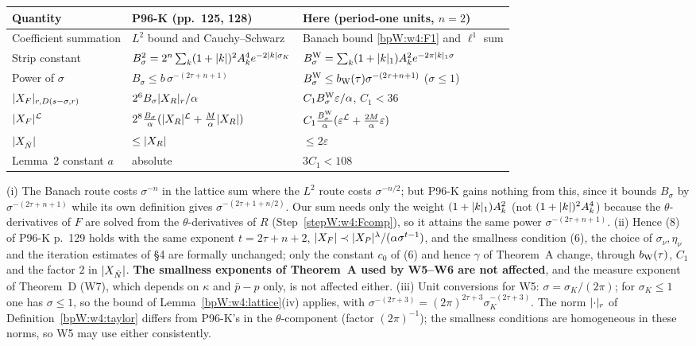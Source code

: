 \begin{remark}\label{bpW:w4:compare}
\begin{center}\small
\begin{tabular}{@{}lll@{}}
\toprule
Quantity & P96-K (pp.~125, 128) & Here (period-one units, $n=2$)\\
\midrule
Coefficient summation & $L^2$ bound and Cauchy--Schwarz & Banach bound \ref{bpW:w4:F1} and $\ell^1$ sum\\
Strip constant & $B_\sigma^2=2^n\sum_k(1+\lvert k\rvert)^2A_k^4e^{-2\lvert k\rvert\sigma_K}$ & $B^{\rm W}_\sigma=\sum_k(1+\lvert k\rvert_1)A_k^2e^{-2\pi\lvert k\rvert_1\sigma}$\\
Power of $\sigma$ & $B_\sigma\le b\,\sigma^{-(2\tau+n+1)}$ & $B^{\rm W}_\sigma\le b_{\rm W}(\tau)\sigma^{-(2\tau+n+1)}$ ($\sigma\le1$)\\
$\lvert X_F\rvert_{r,D(s-\sigma,r)}$ & $2^6B_\sigma\lvert X_R\rvert_r/\alpha$ & $C_1B^{\rm W}_\sigma\varepsilon/\alpha$, $C_1<36$\\
$\lvert X_F\rvert^{\mathcal L}$ & $2^8\frac{B_\sigma}\alpha(\lvert X_R\rvert^{\mathcal L}+\frac M\alpha\lvert X_R\rvert)$ & $C_1\frac{B^{\rm W}_\sigma}\alpha(\varepsilon^{\mathcal L}+\frac{2M}\alpha\varepsilon)$\\
$\lvert X_{\hat N}\rvert$ & $\le\lvert X_R\rvert$ & $\le2\varepsilon$\\
Lemma~2 constant $a$ & absolute & $3C_1<108$\\
\bottomrule
\end{tabular}
\end{center}
(i) The Banach route costs $\sigma^{-n}$ in the lattice sum where the $L^2$ route costs $\sigma^{-n/2}$; but P96-K
gains nothing from this, since it bounds $B_\sigma$ by $\sigma^{-(2\tau+n+1)}$ while its own definition gives
$\sigma^{-(2\tau+1+n/2)}$. Our sum needs only the weight $(1+\lvert k\rvert_1)A_k^2$ (not $(1+\lvert k\rvert)^2A_k^4$) because the
$\theta$-derivatives of $F$ are solved from the $\theta$-derivatives of $R$ (Step~\ref{stepW:w4:Fcomp}), so it attains the
same power $\sigma^{-(2\tau+n+1)}$.
(ii) Hence (8) of P96-K p.~129 holds with the same exponent $t=2\tau+n+2$, $\lvert X_F\rvert\prec\lvert X_P\rvert^\lambda/(\alpha\sigma^{t-1})$,
and the smallness condition (6), the choice of $\sigma_\nu,\eta_\nu$ and the iteration estimates of \S4 are formally
unchanged; only the constant $c_0$ of (6) and hence $\gamma$ of Theorem~A change, through $b_{\rm W}(\tau)$, $C_1$ and the
factor $2$ in $\lvert X_{\hat N}\rvert$. \textbf{The smallness exponents of Theorem~A used by W5--W6 are not affected}, and the
measure exponent of Theorem~D (W7), which depends on $\kappa$ and $\bar p-p$ only, is not affected either.
(iii) Unit conversions for W5: $\sigma=\sigma_K/(2\pi)$; for $\sigma_K\le1$ one has $\sigma\le1$, so the bound of
Lemma~\ref{bpW:w4:lattice}(iv) applies, with $\sigma^{-(2\tau+3)}=(2\pi)^{2\tau+3}\sigma_K^{-(2\tau+3)}$. The norm $\lvert \cdot\rvert_r$ of
Definition~\ref{bpW:w4:taylor} differs from P96-K's in the $\theta$-component (factor $(2\pi)^{-1}$); the smallness
conditions are homogeneous in these norms, so W5 may use either consistently.
\end{remark}

